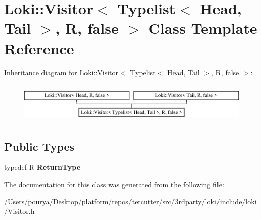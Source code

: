 \hypertarget{classLoki_1_1Visitor_3_01Typelist_3_01Head_00_01Tail_01_4_00_01R_00_01false_01_4}{}\section{Loki\+:\+:Visitor$<$ Typelist$<$ Head, Tail $>$, R, false $>$ Class Template Reference}
\label{classLoki_1_1Visitor_3_01Typelist_3_01Head_00_01Tail_01_4_00_01R_00_01false_01_4}
Inheritance diagram for Loki\+:\+:Visitor$<$ Typelist$<$ Head, Tail $>$, R, false $>$\+:\begin{figure}[H]
\begin{center}
\leavevmode
\includegraphics[height=1.944445cm]{classLoki_1_1Visitor_3_01Typelist_3_01Head_00_01Tail_01_4_00_01R_00_01false_01_4}
\end{center}
\end{figure}
\subsection*{Public Types}
\begin{DoxyCompactItemize}
\item 
\hypertarget{classLoki_1_1Visitor_3_01Typelist_3_01Head_00_01Tail_01_4_00_01R_00_01false_01_4_a5287413dff256f5039759bf6f0ef46f5}{}typedef R {\bfseries Return\+Type}\label{classLoki_1_1Visitor_3_01Typelist_3_01Head_00_01Tail_01_4_00_01R_00_01false_01_4_a5287413dff256f5039759bf6f0ef46f5}

\end{DoxyCompactItemize}


The documentation for this class was generated from the following file\+:\begin{DoxyCompactItemize}
\item 
/\+Users/pourya/\+Desktop/platform/repos/tetcutter/src/3rdparty/loki/include/loki/Visitor.\+h\end{DoxyCompactItemize}

